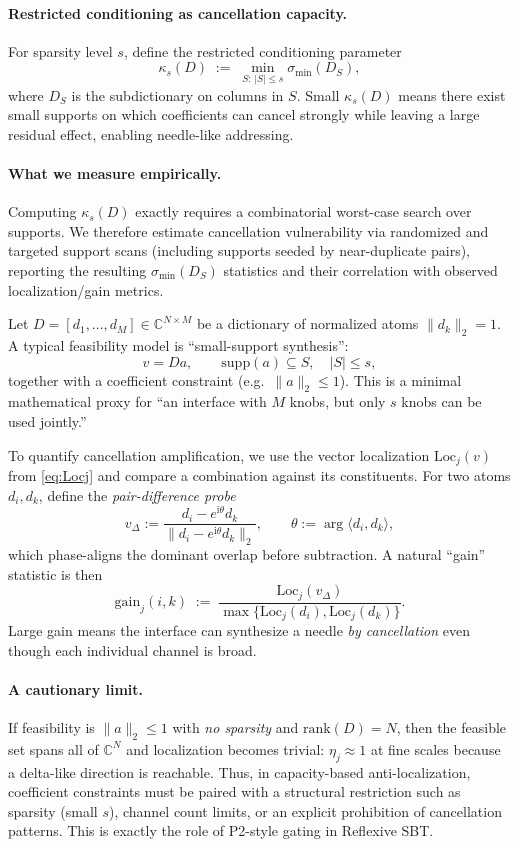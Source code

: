 \documentclass[11pt]{article}
\theoremstyle{plain}
\theoremstyle{definition}
\theoremstyle{remark}
\newcommand{\C}{\mathbb{C}}
\begin{document}
\paragraph{Restricted conditioning as cancellation capacity.}
For sparsity level \(s\), define the restricted conditioning parameter
\[
\kappa_s(D)\;:=\;\min_{S:\,|S|\le s}\sigma_{\min}(D_S),
\]
where \(D_S\) is the subdictionary on columns in \(S\).
Small \(\kappa_s(D)\) means there exist small supports on which coefficients can cancel strongly while leaving a large residual effect, enabling needle-like addressing.

\paragraph{What we measure empirically.}
Computing \(\kappa_s(D)\) exactly requires a combinatorial worst-case search over supports.
We therefore estimate cancellation vulnerability via randomized and targeted support scans (including supports seeded by near-duplicate pairs), reporting the resulting \(\sigma_{\min}(D_S)\) statistics and their correlation with observed localization/gain metrics.

Let \(D = [d_1,\dots,d_M] \in \C^{N\times M}\) be a dictionary of normalized atoms \(\|d_k\|_2=1\).
A typical feasibility model is ``small-support synthesis'':
\[
v = D a, \qquad \mathrm{supp}(a) \subseteq S, \quad |S|\le s,
\]
together with a coefficient constraint (e.g.\ \(\|a\|_2 \le 1\)).
This is a minimal mathematical proxy for ``an interface with \(M\) knobs, but only \(s\) knobs can be used jointly.''

To quantify cancellation amplification, we use the vector localization \(\mathrm{Loc}_j(v)\) from \eqref{eq:Locj} and compare a combination against its constituents.
For two atoms \(d_i,d_k\), define the \emph{pair-difference probe}
\[
v_{\Delta} := \frac{d_i - e^{\mathrm{i}\theta} d_k}{\|d_i - e^{\mathrm{i}\theta} d_k\|_2},
\qquad \theta := \arg\langle d_i,d_k\rangle,
\]
which phase-aligns the dominant overlap before subtraction.
A natural ``gain'' statistic is then
\[
\mathrm{gain}_j(i,k)
\;:=\;
\frac{\mathrm{Loc}_j(v_\Delta)}{\max\{\mathrm{Loc}_j(d_i),\mathrm{Loc}_j(d_k)\}}.
\]
Large gain means the interface can synthesize a needle \emph{by cancellation} even though each individual channel is broad.

\paragraph{A cautionary limit.}
If feasibility is \(\|a\|_2 \le 1\) with \emph{no sparsity} and \(\mathrm{rank}(D)=N\), then the feasible set spans all of \(\C^N\) and localization becomes trivial: \(\eta_j \approx 1\) at fine scales because a delta-like direction is reachable.
Thus, in capacity-based anti-localization, coefficient constraints must be paired with a structural restriction such as sparsity (small \(s\)), channel count limits, or an explicit prohibition of cancellation patterns.
This is exactly the role of P2-style gating in Reflexive SBT.
\end{document}
